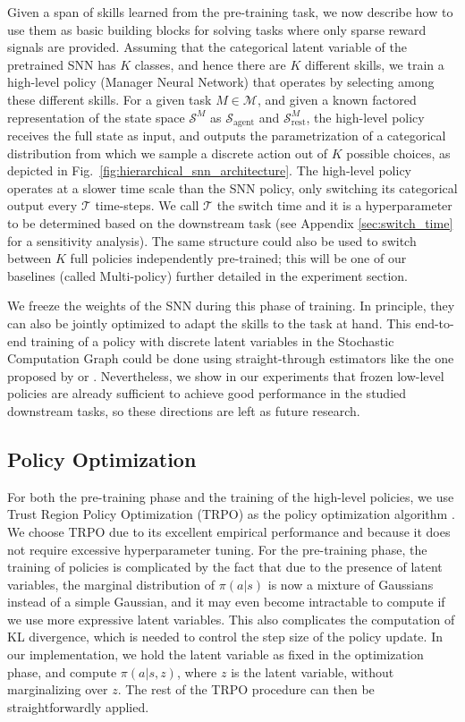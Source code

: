 \documentclass{article} %
\newcommand{\sset}{\mathcal{S}}
\newcommand{\mdpset}{\mathcal{M}}
\newcommand{\agent}{\mathrm{agent}}
\begin{document}
Given a span of skills learned from the pre-training task, we now describe how to use them as basic building blocks for solving tasks where only sparse reward signals are provided. Assuming that the categorical latent variable of the pretrained SNN has $K$ classes, and hence there are $K$ different skills, we train a high-level policy (Manager Neural Network) that operates by selecting among these different skills. 
For a given task $M \in \mdpset$, and given a known factored representation of the state space $\sset^M$ as $\sset_\agent$ and $\sset_{\mathrm{rest}}^M$, the high-level policy receives the full state as input, and outputs the parametrization of a categorical distribution from which we sample a discrete action out of $K$ possible choices, as depicted in Fig.\ \ref{fig:hierarchical_snn_architecture}. 
The high-level policy operates at a slower time scale than the SNN policy, only switching its categorical output every $\mathcal{T}$ time-steps. We call $\mathcal{T}$ the switch time and it is a hyperparameter to be determined based on the downstream task (see Appendix \ref{sec:switch_time} for a sensitivity analysis). 
The same structure could also be used to switch between $K$ full policies independently pre-trained; this will be one of our baselines (called Multi-policy) further detailed in the experiment section.

We freeze the weights of the SNN during this phase of training. In principle, they can also be jointly optimized to adapt the skills to the task at hand. This end-to-end training of a policy with discrete latent variables in the Stochastic Computation Graph could be done using straight-through estimators like the one proposed by \cite{jang2016gumbel} or \cite{maddison2016concrete}. Nevertheless, we show in our experiments that frozen low-level policies are already sufficient to achieve good performance in the studied downstream tasks, so these directions are left as future research.


\subsection{Policy Optimization}
\label{section:method:polopt}

For both the pre-training phase and the training of the high-level policies, we use Trust Region Policy Optimization (TRPO) as the policy optimization algorithm \citep{Schulman15TRPO}. We choose TRPO due to its excellent empirical performance and because it does not require excessive hyperparameter tuning. For the pre-training phase, the training of policies is complicated by the fact that due to the presence of latent variables, the marginal distribution of $\pi(a|s)$ is now a mixture of Gaussians instead of a simple Gaussian, and it may even become intractable to compute if we use more expressive latent variables. This also complicates the computation of KL divergence, which is needed to control the step size of the policy update. In our implementation, we hold the latent variable as fixed in the optimization phase, and compute $\pi(a|s,z)$, where $z$ is the latent variable, without marginalizing over $z$. The rest of the TRPO procedure can then be straightforwardly applied. 
\end{document}
